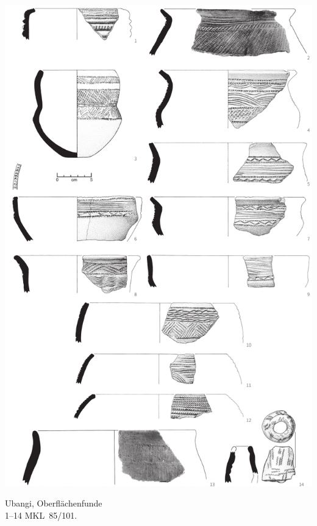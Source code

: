 \begin{pl}[H]
	\includegraphics{plt/Taf18.pdf}
	\vspace{.75em}\caption{\mbox{Ubangi}, Oberflächenfunde \\ 1--14 MKL~85/101.}
	\label{pl:18}
\end{pl}

